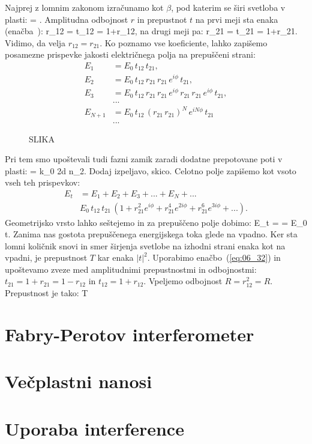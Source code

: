 Najprej z lomnim zakonom izračunamo kot $\beta$, pod katerim se širi svetloba v plasti:
\beq
\sin\beta = \sin\alpha.
\label{eq:06_25}
\eeq
Amplitudna odbojnost $r$ in prepustnot $t$ na prvi meji sta enaka (enačba~):
\beq
r_{12} = \qquad 
{}\qquad t_{12} = 1+r_{12},
\label{eq:06_26}
\eeq
na drugi meji pa:
\beq
r_{21} = \qquad 
{}\qquad t_{21} = 1+r_{21}.
\label{eq:06_27}
\eeq
Vidimo, da velja $r_{12} = r_{21}$. Ko poznamo vse koeficiente, lahko zapišemo
posamezne prispevke jakosti električnega polja na prepuščeni strani:
\begin{align}
E_1 &= E_0\,t_{12}\,t_{21},\\
E_2 &= E_0\,t_{12}\,r_{21}\,r_{21}\,e^{i\phi}\,t_{21},\\
E_3 &= E_0\,t_{12}\,r_{21}\,r_{21}\,e^{i\phi}\,r_{21}\,r_{21}\,e^{i\phi}\,t_{21},\\
&...\\
E_{N+1} &= E_0\,t_{12}\,\left(r_{21}\,r_{21}\right)^N\,e^{iN\phi}\,t_{21}\\
&...
\label{eq:06_29}
\end{align}

\begin{figure}[ht]
\centering
\def\svgwidth{140truemm} 
%
\caption{SLIKA}
\label{fig:05_Nrez}
\end{figure}

Pri tem smo upoštevali tudi fazni zamik zaradi dodatne prepotovane poti v plasti:
\beq
\phi = k_0 2d \cos \beta n_2.
\label{eq:06_31}
\eeq
Dodaj izpeljavo, skico. 
Celotno polje zapišemo kot vsoto vseh teh prispevkov:
\begin{align}
E_t &= E_1+E_2+E_3+... + E_N + ... \\
& E_0\, t_{12}\,t_{21}\,\left(1 + r_{21}^2 e^{i\phi} + r_{21}^4 e^{2i\phi} + r_{21}^6 e^{3i\phi} + ... \right).
\label{eq:06_30}
\end{align}
Geometrijsko vrsto lahko seštejemo in za prepuščeno polje dobimo:
\beq
E_t =  = E_0 t.
\label{eq:06_32}
\eeq
Zanima nas gostota prepuščenega energijskega toka glede na vpadno. Ker sta lomni količnik snovi
in smer širjenja svetlobe na izhodni strani enaka kot na vpadni, je prepustnost $T$ kar enaka $|t|^2$.
Uporabimo enačbo~(\ref{eq:06_32}) in upoštevamo zveze med amplitudnimi prepustnostmi in odbojnostmi:
$t_{21} = 1+r_{21} = 1-r_{12}$ in $t_{12} = 1+r_{12}$. Vpeljemo odbojnost $R = r_{12}^2 = R$.
Prepustnost je tako:
\beq
T
\label{eq:06_33}
\eeq



\section{Fabry-Perotov interferometer}
\section{Večplastni nanosi}
\section{Uporaba interference}
